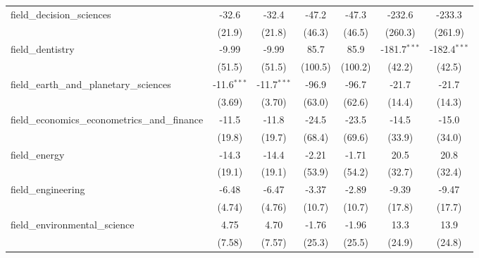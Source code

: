 \begin{tabular}{lcccccc}
   field\_decision\_sciences                                   & -32.6         & -32.4         & -47.2         & -47.3         & -232.6         & -233.3\\   
                                                               & (21.9)        & (21.8)        & (46.3)        & (46.5)        & (260.3)        & (261.9)\\   
   field\_dentistry                                            & -9.99         & -9.99         & 85.7          & 85.9          & -181.7$^{***}$ & -182.4$^{***}$\\   
                                                               & (51.5)        & (51.5)        & (100.5)       & (100.2)       & (42.2)         & (42.5)\\   
   field\_earth\_and\_planetary\_sciences                      & -11.6$^{***}$ & -11.7$^{***}$ & -96.9         & -96.7         & -21.7          & -21.7\\   
                                                               & (3.69)        & (3.70)        & (63.0)        & (62.6)        & (14.4)         & (14.3)\\   
   field\_economics\_econometrics\_and\_finance                & -11.5         & -11.8         & -24.5         & -23.5         & -14.5          & -15.0\\   
                                                               & (19.8)        & (19.7)        & (68.4)        & (69.6)        & (33.9)         & (34.0)\\   
   field\_energy                                               & -14.3         & -14.4         & -2.21         & -1.71         & 20.5           & 20.8\\   
                                                               & (19.1)        & (19.1)        & (53.9)        & (54.2)        & (32.7)         & (32.4)\\   
   field\_engineering                                          & -6.48         & -6.47         & -3.37         & -2.89         & -9.39          & -9.47\\   
                                                               & (4.74)        & (4.76)        & (10.7)        & (10.7)        & (17.8)         & (17.7)\\   
   field\_environmental\_science                               & 4.75          & 4.70          & -1.76         & -1.96         & 13.3           & 13.9\\   
                                                               & (7.58)        & (7.57)        & (25.3)        & (25.5)        & (24.9)         & (24.8)\\   

\end{tabular}

